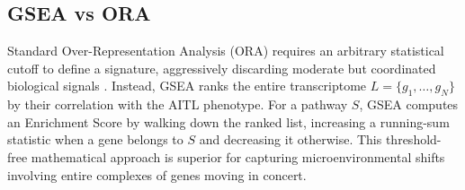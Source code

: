 \documentclass[a4paper,11pt,twocolumn]{article}
\begin{document}
	\subsection{GSEA vs ORA}
	Standard Over-Representation Analysis (ORA) requires an arbitrary statistical cutoff to define a signature, aggressively discarding moderate but coordinated biological signals \cite{Khatri2012}. Instead, GSEA \cite{Subramanian2005, Korotkevich2019} ranks the entire transcriptome $L = \{g_1, \dots, g_N\}$ by their correlation with the AITL phenotype. For a pathway $S$, GSEA computes an Enrichment Score by walking down the ranked list, increasing a running-sum statistic when a gene belongs to $S$ and decreasing it otherwise. This threshold-free mathematical approach is superior for capturing microenvironmental shifts involving entire complexes of genes moving in concert.
	
\end{document}
